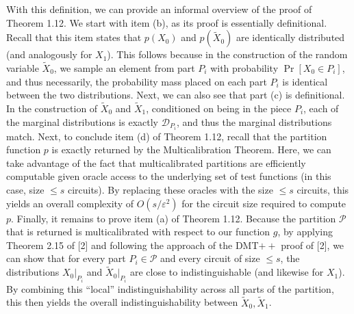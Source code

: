 


With this definition, we can provide an informal overview of the proof of Theorem 1.12.
We start with item (b), as its proof is essentially definitional. Recall that this item states that $p(X_{0})$ and $p(\widetilde{X}_{0})$ are identically distributed (and analogously for $X_{1}$). This follows because in the construction of the random variable $\widetilde{X}_{0}$, we sample an element from part $P_{i}$ with probability $\Pr[X_{0}\in P_{i}]$, and thus necessarily, the probability mass placed on each part $P_{i}$ is identical between the two distributions. Next, we can also see that part (c) is definitional. In the construction of $\widetilde{X}_{0}$ and $\widetilde{X}_{1}$, conditioned on being in the piece $P_{i}$, each of the marginal distributions is exactly $\mathcal{D}_{P_{i}}$, and thus the marginal distributions match.
Next, to conclude item (d) of Theorem 1.12, recall that the partition function $p$ is exactly returned by the Multicalibration Theorem. Here, we can take advantage of the fact that multicalibrated partitions are efficiently computable given oracle access to the underlying set of test functions (in this case, size $\leq s$ circuits). By replacing these oracles with the size $\leq s$ circuits, this yields an overall complexity of $O(s/\varepsilon^{2})$ for the circuit size required to compute $p$.
Finally, it remains to prove item (a) of Theorem 1.12. Because the partition $\mathcal{P}$ that is returned is multicalibrated with respect to our function $g$, by applying Theorem 2.15 of [2] and following the approach of the DMT$++$ proof of [2], we can show that for every part $P_{i}\in\mathcal{P}$ and every circuit of size $\leq s$, the distributions $X_{0}|_{P_{i}}$ and $\widetilde{X}_{0}|_{P_{i}}$ are close to indistinguishable (and likewise for $X_{1}$). By combining this “local” indistinguishability across all parts of the partition, this then yields the overall indistinguishability between $\widetilde{X}_{0},\widetilde{X}_{1}$.\par




